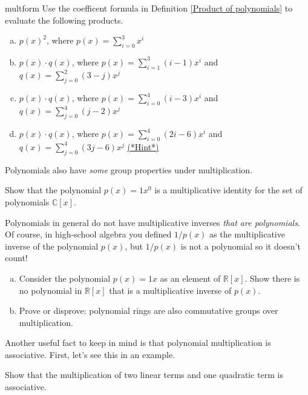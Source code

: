 \begin {exercise}{multform}
Use the coefficent formula in Definition \ref{Product of polynomials} to evaluate the following products.
\begin {enumerate}[(a)]
\item
$p(x)^2$, where $p(x) = \sum_{i=0}^{3} x^i$
\item
$p(x) \cdot q(x)$, where $p(x) = \sum_{i=1}^{3} (i-1)x^i$  and $q(x) = \sum_{j=0}^{2} (3-j)x^j$
\item
$p(x) \cdot q(x)$, where $p(x) = \sum_{i=0}^{4} (i-3)x^i$  and $q(x) = \sum_{j=0}^{4} (j-2)x^j$ 
\item
$p(x) \cdot q(x)$, where $p(x) = \sum_{i=0}^{4} (2i-6)x^i$  and $q(x) = \sum_{j=0}^{4} (3j-6)x^j$ 
\hyperref[sec:polyrings:hints]{(*Hint*)} 
\end{enumerate}
\end {exercise}


Polynomials also have \emph{some} group properties under multiplication.

\begin{exercise}{}
Show that the polynomial $p(x) = 1x^0$ is a multiplicative identity for the set of polynomials $\mathbb{C}[x]$.
\end{exercise}

Polynomials in general do not have multiplicative inverses \emph{that are polynomials}.  Of course, in high-school algebra you defined $1/p(x)$ as the multiplicative inverse of the polynomial $p(x)$, but $1/p(x)$ is not a polynomial so it doesn't count!

\begin{exercise}{}
\begin{enumerate}[(a)]
\item
Consider the  polynomial $p(x)= 1x$ as an element of $\mathbb{R}[x]$. Show there is no polynomial in $\mathbb{R}[x]$ that is a multiplicative inverse of $p(x)$.
\item
Prove or disprove: polynomial rings are also commutative groups over multiplication.
\end{enumerate}
\end{exercise}

Another useful fact to keep in mind is that polynomial multiplication is associative.  First, let's see this in an example.


\begin{exercise}{}
Show that the multiplication of two linear terms and one quadratic term is associative.
\end{exercise}

